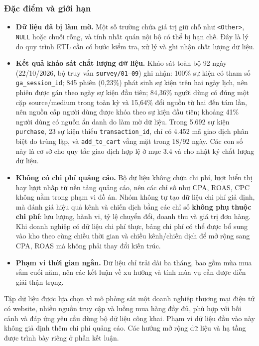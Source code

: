 \subsubsection{Đặc điểm và giới hạn}

\begin{itemize}
    \item \textbf{Dữ liệu đã bị làm mờ.} Một số trường chứa giá trị giữ chỗ như \texttt{<Other>}, \texttt{NULL} hoặc chuỗi rỗng, và tính nhất quán nội bộ có thể bị hạn chế. Đây là lý do quy trình ETL cần có bước kiểm tra, xử lý và ghi nhận chất lượng dữ liệu.

    \item \textbf{Kết quả khảo sát chất lượng dữ liệu.} Khảo sát toàn bộ 92 ngày (22/10/2026, bộ truy vấn \texttt{survey/01}--\texttt{09}) ghi nhận: 100\% sự kiện có tham số \texttt{ga\_session\_id}; 845 phiên (0,23\%) phát sinh sự kiện trên hai ngày lịch, nên phiên được gán theo ngày sự kiện đầu tiên; 84,36\% người dùng có đúng một cặp source/medium trong toàn kỳ và 15,64\% đổi nguồn từ hai đến tám lần, nên nguồn cấp người dùng được khóa theo sự kiện đầu tiên; khoảng 41\% người dùng có nguồn ẩn danh do làm mờ dữ liệu. Trong 5.692 sự kiện \texttt{purchase}, 23 sự kiện thiếu \texttt{transaction\_id}, chỉ có 4.452 mã giao dịch phân biệt do trùng lặp, và \texttt{add\_to\_cart} vắng mặt trong 18/92 ngày. Các con số này là cơ sở cho quy tắc giao dịch hợp lệ ở mục 3.4 và cho nhật ký chất lượng dữ liệu.

    \item \textbf{Không có chi phí quảng cáo.} Bộ dữ liệu không chứa chi phí, lượt hiển thị hay lượt nhấp từ nền tảng quảng cáo, nên các chỉ số như CPA, ROAS, CPC không nằm trong phạm vi đồ án. Nhóm không tự tạo dữ liệu chi phí giả định, mà đánh giá hiệu quả kênh và chiến dịch bằng các chỉ số \textbf{không phụ thuộc chi phí}: lưu lượng, hành vi, tỷ lệ chuyển đổi, doanh thu và giá trị đơn hàng. Khi doanh nghiệp có dữ liệu chi phí thực, bảng chi phí có thể được bổ sung vào kho theo cùng chiều thời gian và chiều kênh/chiến dịch để mở rộng sang CPA, ROAS mà không phải thay đổi kiến trúc.

    \item \textbf{Phạm vi thời gian ngắn.} Dữ liệu chỉ trải dài ba tháng, bao gồm mùa mua sắm cuối năm, nên các kết luận về xu hướng và tính mùa vụ cần được diễn giải thận trọng.
\end{itemize}

Tập dữ liệu được lựa chọn vì mô phỏng sát một doanh nghiệp thương mại điện tử có website, nhiều nguồn truy cập và luồng mua hàng đầy đủ, phù hợp với bối cảnh và đáp ứng yêu cầu dùng bộ dữ liệu công khai. Phạm vi dữ liệu đầu vào này không giả định thêm chi phí quảng cáo. Các hướng mở rộng dữ liệu và hạ tầng được trình bày riêng ở phần kết luận.


